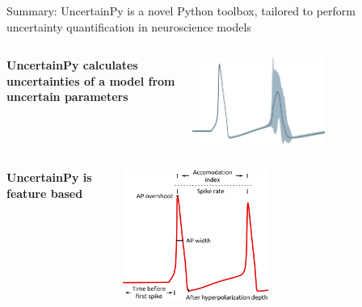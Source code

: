 \documentclass[presentation]{beamer}
\begin{document}
  \begin{frame}{Summary: UncertainPy is a novel Python toolbox, tailored to perform uncertainty quantification in neuroscience models}
\vspace{-10mm}
\begin{columns}

     \begin{center}
        \raggedright
      \bf{UncertainPy calculates uncertainties of a model from uncertain parameters}
     \end{center}
     \begin{center}
            \includegraphics[width=0.6\textwidth]{confidence_interval_small.png}
     \end{center}

 \end{columns}


\begin{columns}
  \begin{center}
      \raggedright
   \bf{UncertainPy is feature based}
  \end{center}
     \begin{center}
            \includegraphics[width=0.5\textwidth]{features.png}
     \end{center}


\end{columns}
\end{frame}
\end{document}
